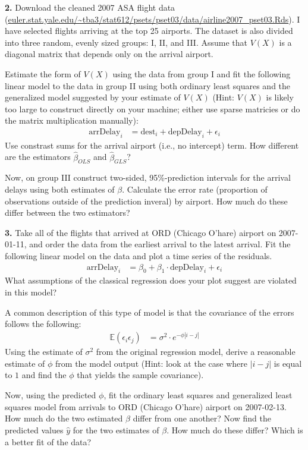 \documentclass[12pt]{article}
\begin{document}
{\bf 2.} Download the cleaned 2007 ASA flight data
(\url{euler.stat.yale.edu/~tba3/stat612/psets/pset03/data/airline2007_pset03.Rds}).
I have selected flights arriving at the top 25 airports. The dataset is
also divided into three random, evenly sized groups: I, II, and III.
Assume that $V(X)$ is a diagonal matrix that depends only on the arrival airport.

Estimate the form of $V(X)$ using the data from group I and fit the following linear
model to the data in group II using both ordinary least squares and the generalized
model suggested by your estimate of $V(X)$ (Hint: $V(X)$ is likely too large to
construct directly on your machine; either use sparse matricies or do the
matrix multiplication manually):
\begin{align}
\text{arrDelay}_i &= \text{dest}_i + \text{depDelay}_i + \epsilon_i \label{airlineMod}
\end{align}
Use constrast sums for the arrival airport (i.e., no intercept) term. How different
are the estimators $\widehat{\beta}_{OLS}$ and $\widehat{\beta}_{GLS}$?

Now, on group III construct two-sided, 95\%-prediction intervals for the arrival
delays using both estimates of $\beta$. Calculate the error rate (proportion of
observations outside of the prediction inveral) by airport. How much do
these differ between the two estimators?

{\bf 3.} Take all of the flights that arrived at ORD (Chicago O'hare) airport on
2007-01-11, and order the data from the earliest arrival to the latest arrival.
Fit the following linear model on the data and plot a time series of the residuals.
\begin{align}
\text{arrDelay}_i &= \beta_0 + \beta_1\cdot\text{depDelay}_i + \epsilon_i
\end{align}
What assumptions of the classical regression does your plot suggest are
violated in this model?

A common description of this type of model is that the covariance of the errors
follows the following:
\begin{align}
\mathbb{E}(\epsilon_i \epsilon_j) &= \sigma^2 \cdot e^{- \phi |i - j|}
\end{align}
Using the estimate of $\sigma^2$ from the original regression model, derive
a reasonable estimate of $\phi$ from the model output (Hint: look at the case
where $|i-j|$ is equal to $1$ and find the $\phi$ that yields the
sample covariance).

Now, using the predicted $\phi$, fit the ordinary least squares and generalized
least squares model from arrivals to ORD (Chicago O'hare) airport on 2007-02-13.
How much do the two estimated $\widehat{\beta}$ differ from one another? Now find the
predicted values $\widehat{y}$ for the two estimates of $\beta$. How much do
these differ? Which is a better fit of the data?
\end{document}
